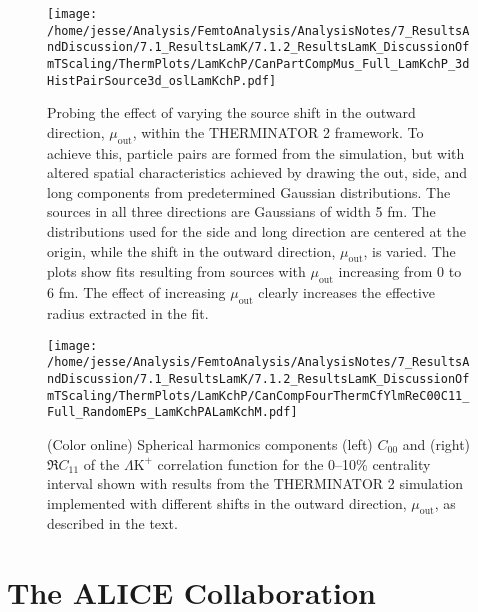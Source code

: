 \documentclass[ALICE,manyauthors]{cernphprep}
\newcommand{\LamKchP}{$\Lambda\mathrm{K^{+}}$\xspace}
\begin{document}
\begin{figure}[h]
  \centering
  \texttt{[image: /home/jesse/Analysis/FemtoAnalysis/AnalysisNotes/7\_ResultsAndDiscussion/7.1\_ResultsLamK/7.1.2\_ResultsLamK\_DiscussionOfmTScaling/ThermPlots/LamKchP/CanPartCompMus\_Full\_LamKchP\_3dHistPairSource3d\_oslLamKchP.pdf]}
  \caption[Varying $\mu_{\mathrm{Out}}$ with THERMINATOR 2]
  {
  Probing the effect of varying the source shift in the outward direction, $\mu_{\mathrm{out}}$, within the THERMINATOR 2 framework.  
  To achieve this, particle pairs are formed from the simulation, but with altered spatial characteristics achieved by drawing the out, side, and long components from predetermined Gaussian distributions.  
  The sources in all three directions are Gaussians of width 5 fm.
  The distributions used for the side and long direction are centered at the origin, while the shift in the outward direction, $\mu_{\mathrm{out}}$, is varied.
  The plots show fits resulting from sources with $\mu_{\mathrm{out}}$ increasing from 0 to 6 fm. 
  The effect of increasing $\mu_{\mathrm{out}}$ clearly increases the effective radius extracted in the fit.
  }
  \label{fig:LamKchP_ThermSources_VaryMuOut}
\end{figure}



\begin{figure}[h]
  \centering
  \texttt{[image: /home/jesse/Analysis/FemtoAnalysis/AnalysisNotes/7\_ResultsAndDiscussion/7.1\_ResultsLamK/7.1.2\_ResultsLamK\_DiscussionOfmTScaling/ThermPlots/LamKchP/CanCompFourThermCfYlmReC00C11\_Full\_RandomEPs\_LamKchPALamKchM.pdf]}
  \caption[\LamKchP $C_{00}$ and $\Re C_{11}$ Spherical Harmonic Components (0--10\%) with THERMINATOR 2 ($b = 2$ fm]
  {
  (Color online) Spherical harmonics components (left) $C_{00}$ and (right) $\Re C_{11}$ of the \LamKchP correlation function for the 0--10\% centrality interval shown with results from the THERMINATOR 2 simulation implemented with different shifts in the outward direction, $\mu_{\mathrm{out}}$, as described in the text.
  }
  \label{fig:LamKchP_ThermSources_VaryMuOut_SH}
\end{figure}






\clearpage


\section{The ALICE Collaboration}
\label{app:collab}
\end{document}
